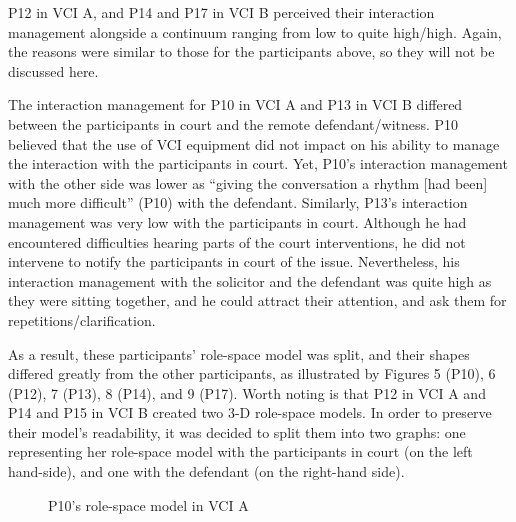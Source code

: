 \documentclass[output=paper]{langsci/langscibook}
\begin{document}
P12 in \textsc{VCI} A, and P14 and P17 in \textsc{VCI} B perceived their interaction management alongside a continuum ranging from low to quite high/high. Again, the reasons were similar to those for the participants above, so they will not be discussed here. 

The interaction management for P10 in \textsc{VCI} A and P13 in \textsc{VCI} B differed between the participants in court and the remote defendant/witness. P10 believed that the use of \textsc{VCI} equipment did not impact on his ability to manage the interaction with the participants in court. Yet, P10’s interaction management with the other side was lower as “giving the conversation a rhythm [had been] much more difficult” (P10) with the defendant. Similarly, P13’s interaction management was very low with the participants in court. Although he had encountered difficulties hearing parts of the court interventions, he did not intervene to notify the participants in court of the issue. Nevertheless, his interaction management with the solicitor and the defendant was quite high as they were sitting together, and he could attract their attention, and ask them for repetitions/clarification.

As a result, these participants’ role-space model was split, and their shapes differed greatly from the other participants, as illustrated by Figures 5 (P10), 6 (P12), 7 (P13), 8 (P14), and 9 (P17). Worth noting is that P12 in \textsc{VCI} A and P14 and P15 in \textsc{VCI} B created two 3-D role-space models. In order to preserve their model’s readability, it was decided to split them into two graphs: one representing her role-space model with the participants in court (on the left hand-side), and one with the defendant (on the right-hand side).

  

 

\begin{figure}
\caption{P10's role-space model in \textsc{VCI} A}
\end{figure}
\end{document}
